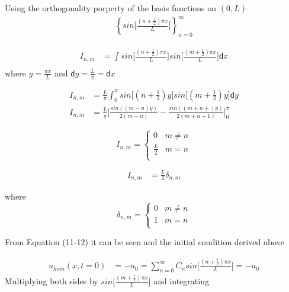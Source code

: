 \documentclass[a4paper]{article}
\begin{document}
\hspace{10mm}

Using the orthogonality porperty of the basis functions on $(0, L)$
\begin{align*}
\left \{ sin \bigg[\frac{(n+\frac{1}{2}) \pi x}{L}\bigg] \right \}_{n=0}^{\infty}
\end{align*}

\begin{align*}
I_{n,m} &= \int sin\bigg[\frac{(n+\frac{1}{2}) \pi x}{L} \bigg] sin\bigg[\frac{(m+\frac{1}{2}) \pi x}{L} \bigg]\mathsf{d}x \\
\end{align*}
where $y = \frac{\pi x}{L} $ and $\mathsf{d}y = \frac{L}{\pi} = \mathsf{d}x$

\begin{align*}
I_{n,m} &= \frac{L}{\pi}\int_{0}^{\pi} sin\bigg[(n+\frac{1}{2}) y \bigg] sin\bigg[(m+\frac{1}{2}) y \bigg]\mathsf{d}y  \\
I_{n,m} &= \frac{L}{\pi} \bigg[\frac{sin((m - n)y)}{2(m - n)} - \frac{sin((m + n + )y)}{2(m + n + 1)} \bigg]_{0}^{\pi} 
\end{align*}

\[
I_{n,m} = 
\begin{cases}
  0 & m \ne n \\
  \frac{L}{2} & m = n \\
\end{cases}
\]

\begin{align*}
I_{n,m} &= \frac{L}{2} \delta_{n,m}
\end{align*}

where 
\[
\delta_{n,m} = 
\begin{cases}
  0 & m \ne n \\
  1 & m = n \\
\end{cases}
\]

From Equation (11-12) it can be seen and the initial condition derived above

\begin{align*}
 u_{hom}(x,t = 0) &= -u_{0} = \sum_{n=0}^{\infty}C_{n}sin\bigg[\frac{(n+\frac{1}{2}) \pi x}{L} \bigg] = -u_{0}
\end{align*}
Multiplying both sides by $sin\bigg[\frac{(m+\frac{1}{2}) \pi x}{L} \bigg]$ and integrating
\end{document}
